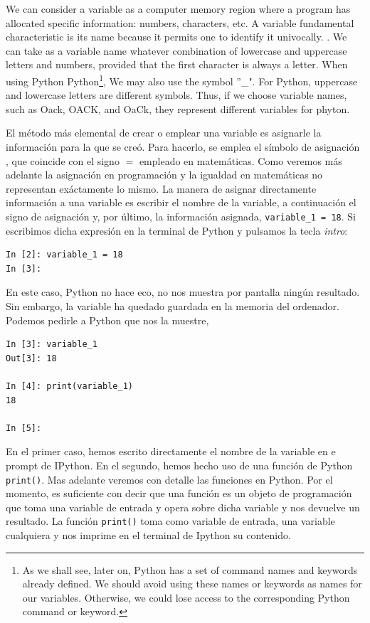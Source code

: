 \begin{paracol}{2}
\switchcolumn
We can consider a variable as a computer memory region where a program has allocated specific information: numbers, characters, etc. A variable fundamental characteristic is its name because it permits one to identify it univocally. . We can take as a variable name whatever combination of lowercase and uppercase letters and numbers, provided that the first character is always a letter. When using Python  Python\footnote{As we shall see, later on, Python has a set of command names and keywords already defined. We should avoid using these names or keywords as names for our variables. Otherwise, we could lose access to the corresponding Python command or keyword.}, We may also use the symbol ''\_". For Python, uppercase and lowercase letters are different symbols. Thus, if we choose variable names, such as Oack, OACK, and OaCk, they represent different variables for phyton.

\switchcolumn
El método más elemental de crear o emplear una variable es asignarle la información para la que se creó. Para hacerlo, se emplea el símbolo de asignación  , que coincide con el signo $=$ empleado en matemáticas. Como veremos más adelante la asignación en programación y la igualdad en matemáticas no representan exáctamente lo mismo. La manera de asignar directamente información a una variable es escribir el nombre de la variable, a continuación  el signo de asignación y, por último, la información asignada, \texttt{variable_1 = 18}. Si escribimos dicha expresión en la terminal de Python y pulsamos la tecla \emph{intro}:
\begin{verbatim}
In [2]: variable_1 = 18
In [3]:
\end{verbatim}
En este caso, Python no hace eco, no nos muestra por pantalla ningún resultado. Sin embargo, la variable ha quedado guardada en la memoria del ordenador. Podemos pedirle a Python que nos la muestre, 
\begin{verbatim}
In [3]: variable_1
Out[3]: 18

In [4]: print(variable_1)
18

In [5]: 
\end{verbatim}
En el primer caso, hemos escrito directamente el nombre de la variable en e prompt de IPython. En el segundo, hemos hecho uso de una función de Python \texttt{print()}. Mas adelante veremos con detalle las funciones en Python. Por el momento, es suficiente con decir que una función es un objeto de programación que toma una variable de entrada y opera sobre dicha variable y nos devuelve un resultado. La  función \texttt{print()} toma como variable de entrada, una variable cualquiera y nos imprime en el terminal de Ipython su contenido.


\end{paracol}

